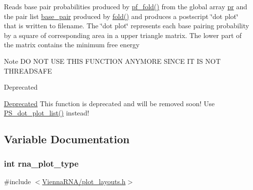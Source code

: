 Reads base pair probabilities produced by \hyperlink{group__pf__fold_gadc3db3d98742427e7001a7fd36ef28c2}{pf\+\_\+fold()} from the global array \hyperlink{fold__vars_8h_ac98ec419070aee6831b44e5c700f090f}{pr} and the pair list \hyperlink{fold__vars_8h_a0244a629b5ab4f58b77590c3dfd130dc}{base\+\_\+pair} produced by \hyperlink{group__mfe__fold__single_gaadafcb0f140795ae62e5ca027e335a9b}{fold()} and produces a postscript \char`\"{}dot plot\char`\"{} that is written to \textquotesingle{}filename\textquotesingle{}. The \char`\"{}dot plot\char`\"{} represents each base pairing probability by a square of corresponding area in a upper triangle matrix. The lower part of the matrix contains the minimum free energy \begin{DoxyNote}{Note}
D\+O N\+O\+T U\+S\+E T\+H\+I\+S F\+U\+N\+C\+T\+I\+O\+N A\+N\+Y\+M\+O\+R\+E S\+I\+N\+C\+E I\+T I\+S N\+O\+T T\+H\+R\+E\+A\+D\+S\+A\+F\+E
\end{DoxyNote}
\begin{DoxyRefDesc}{Deprecated}
\item[\hyperlink{deprecated__deprecated000130}{Deprecated}]This function is deprecated and will be removed soon! Use \hyperlink{group__plotting__utils_ga00ea223b5cf02eb2faae5ff29f0d5e12}{P\+S\+\_\+dot\+\_\+plot\+\_\+list()} instead! \end{DoxyRefDesc}


\subsection{Variable Documentation}
\hypertarget{group__plotting__utils_ga5964c4581431b098b80027d6e14dcdd4}{}
\subsubsection[{rna\+\_\+plot\+\_\+type}]{\setlength{\rightskip}{0pt plus 5cm}int rna\+\_\+plot\+\_\+type}\label{group__plotting__utils_ga5964c4581431b098b80027d6e14dcdd4}


{\ttfamily \#include $<$\hyperlink{plot__layouts_8h}{Vienna\+R\+N\+A/plot\+\_\+layouts.\+h}$>$}



